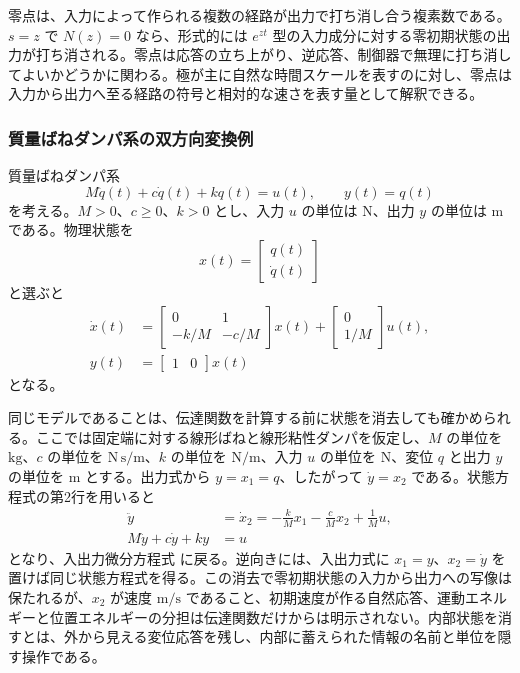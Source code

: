 零点は、入力によって作られる複数の経路が出力で打ち消し合う複素数である。$s=z$ で $N(z)=0$ なら、形式的には $e^{zt}$ 型の入力成分に対する零初期状態の出力が打ち消される。零点は応答の立ち上がり、逆応答、制御器で無理に打ち消してよいかどうかに関わる。極が主に自然な時間スケールを表すのに対し、零点は入力から出力へ至る経路の符号と相対的な速さを表す量として解釈できる。

\subsubsection{質量ばねダンパ系の双方向変換例}

質量ばねダンパ系
\begin{equation}
  M\ddot{q}(t)+c\dot{q}(t)+kq(t)=u(t),
  \qquad y(t)=q(t)
  \label{eq:msd-io-for-realization}
\end{equation}
を考える。$M>0$、$c\ge0$、$k>0$ とし、入力 $u$ の単位は N、出力 $y$ の単位は m である。物理状態を
\begin{equation}
  x(t)=\begin{bmatrix}q(t)\\ \dot{q}(t)\end{bmatrix}
\end{equation}
と選ぶと
\begin{align}
  \dot{x}(t)&=
  \begin{bmatrix}
    0&1\\
    -k/M&-c/M
  \end{bmatrix}x(t)
  +\begin{bmatrix}
    0\\
    1/M
  \end{bmatrix}u(t),\\
  y(t)&=\begin{bmatrix}1&0\end{bmatrix}x(t)
  \label{eq:msd-physical-realization}
\end{align}
となる。

\begin{derivation}
同じモデルであることは、伝達関数を計算する前に状態を消去しても確かめられる。ここでは固定端に対する線形ばねと線形粘性ダンパを仮定し、$M$ の単位を $\mathrm{kg}$、$c$ の単位を $\mathrm{N\,s/m}$、$k$ の単位を $\mathrm{N/m}$、入力 $u$ の単位を $\mathrm{N}$、変位 $q$ と出力 $y$ の単位を $\mathrm{m}$ とする。出力式から $y=x_1=q$、したがって $\dot{y}=x_2$ である。状態方程式の第2行を用いると
\begin{align}
  \ddot{y}
  &=\dot{x}_2
  =
  -\frac{k}{M}x_1-\frac{c}{M}x_2+\frac{1}{M}u,\\
  M\ddot{y}+c\dot{y}+ky&=u
\end{align}
となり、入出力微分方程式  に戻る。逆向きには、入出力式に $x_1=y$、$x_2=\dot{y}$ を置けば同じ状態方程式を得る。この消去で零初期状態の入力から出力への写像は保たれるが、$x_2$ が速度 $\mathrm{m/s}$ であること、初期速度が作る自然応答、運動エネルギーと位置エネルギーの分担は伝達関数だけからは明示されない。内部状態を消すとは、外から見える変位応答を残し、内部に蓄えられた情報の名前と単位を隠す操作である。
\end{derivation}

